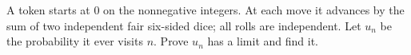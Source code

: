 A token starts at $0$ on the nonnegative integers. At each move it advances by the sum of two independent fair six-sided dice; all rolls are independent. Let $u_n$ be the probability it ever visits $n$. Prove $u_n$ has a limit and find it.
